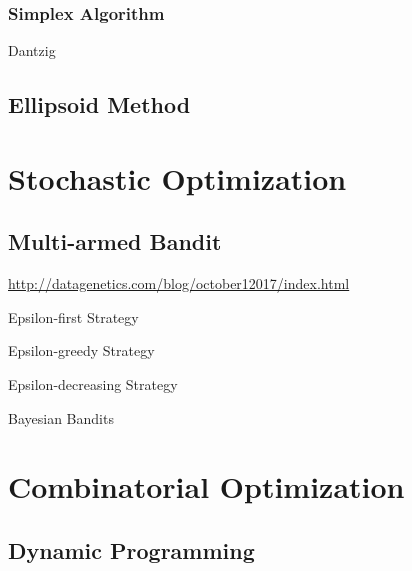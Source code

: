 \subsubsection{Simplex Algorithm}\label{sec:simplex_algorithm}

Dantzig



\subsection{Ellipsoid Method}\label{sec:ellipsoid_method}



\section{Stochastic Optimization}\label{sec:stochastic_optimization}

\subsection{Multi-armed Bandit}\label{sec:multiarmed_bandit}

\url{http://datagenetics.com/blog/october12017/index.html}

Epsilon-first Strategy

Epsilon-greedy Strategy

Epsilon-decreasing Strategy

Bayesian Bandits



\section{Combinatorial Optimization}
\label{sec:combinatorial_optimization}

\subsection{Dynamic Programming}\label{sec:dynamic_programming}

